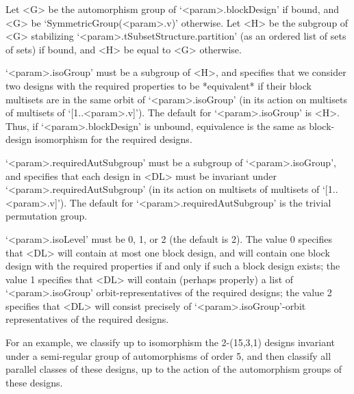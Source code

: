 Let <G> be the automorphism group of `<param>.blockDesign' if bound, and
<G> be `SymmetricGroup(<param>.v)' otherwise. Let <H> be the subgroup of
<G> stabilizing `<param>.tSubsetStructure.partition' (as an ordered list
of sets of sets) if bound, and <H> be equal to <G> otherwise. 

`<param>.isoGroup' must be a subgroup of <H>, and specifies that we
consider two designs with the required properties to be *equivalent*
if their block multisets are in the same orbit of `<param>.isoGroup'
(in its action on multisets of multisets of `[1..<param>.v]'). The
default for `<param>.isoGroup' is <H>. Thus, if `<param>.blockDesign'
is unbound, equivalence is the same as block-design isomorphism for the
required designs.

`<param>.requiredAutSubgroup' must be a subgroup of `<param>.isoGroup',
and specifies that each design in <DL> must be invariant under
`<param>.requiredAutSubgroup' (in its action on multisets of multisets of
`[1..<param>.v]'). The default for `<param>.requiredAutSubgroup' is the
trivial permutation group.

`<param>.isoLevel' must be 0, 1, or 2 (the default is 2).  The value
0 specifies that <DL> will contain at most one block design, and will
contain one block design with the required properties if and only if
such a block design exists; the value 1 specifies that <DL> will contain
(perhaps properly) a list of `<param>.isoGroup' orbit-representatives of
the required designs; the value 2 specifies that <DL> will consist
precisely of `<param>.isoGroup'-orbit representatives of the required
designs.

For an example, we classify up to isomorphism the 2-(15,3,1) designs
invariant under a semi-regular group of automorphisms of order 5, and
then classify all parallel classes of these designs, up to the action
of the automorphism groups of these designs.


